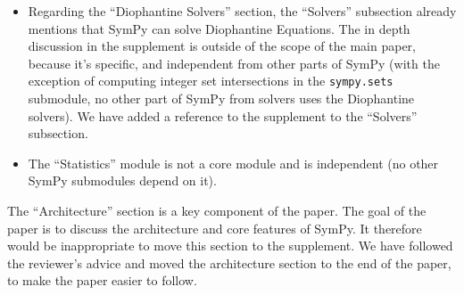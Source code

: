 \documentclass[answers,12pt]{exam}
\begin{document}
\begin{questions}
\begin{solution}
\begin{itemize}
\item Regarding the ``Diophantine Solvers'' section, the ``Solvers''
  subsection already mentions that SymPy can solve Diophantine Equations. The
  in depth discussion in the supplement
  is outside of the scope of the main paper, because it's specific, and
  independent from other parts of SymPy (with the exception of computing integer set
  intersections in the \texttt{sympy.sets} submodule, no other part of SymPy
  from solvers uses the Diophantine solvers). We have
  added a reference to the supplement to the ``Solvers'' subsection.

\item The ``Statistics'' module is not a core module and is independent (no
  other SymPy submodules depend on it).
\end{itemize}

The ``Architecture'' section is a key component of the paper. The goal of the
paper is to discuss the architecture and core features of SymPy. It therefore
would be inappropriate to move this section to the supplement. We have
followed the reviewer's advice and moved the architecture section to the end
of the paper, to make the paper easier to follow.
\end{solution}
\end{questions}
\end{document}
